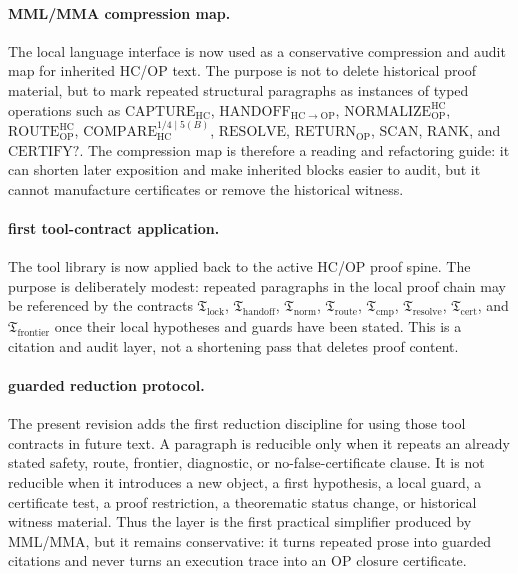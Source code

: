 \paragraph{MML/MMA compression map.}
The local language interface is now used as a conservative compression and audit map for inherited HC/OP text. The purpose is not to delete historical proof material, but to mark repeated structural paragraphs as instances of typed operations such as \(\mathrm{CAPTURE}_{\mathrm{HC}}\), \(\mathrm{HANDOFF}_{\mathrm{HC}\to\mathrm{OP}}\), \(\mathrm{NORMALIZE}_{\mathrm{OP}}^{\mathrm{HC}}\), \(\mathrm{ROUTE}_{\mathrm{OP}}^{\mathrm{HC}}\), \(\mathrm{COMPARE}_{\mathrm{HC}}^{1/4\mid 5(B)}\), \(\mathrm{RESOLVE}\), \(\mathrm{RETURN}_{\mathrm{OP}}\), \(\mathrm{SCAN}\), \(\mathrm{RANK}\), and \(\mathrm{CERTIFY?}\). The compression map is therefore a reading and refactoring guide: it can shorten later exposition and make inherited blocks easier to audit, but it cannot manufacture certificates or remove the historical witness.

\paragraph{first tool-contract application.}
The tool library is now applied back to the active HC/OP proof spine. The purpose is deliberately modest: repeated paragraphs in the local proof chain may be referenced by the contracts \(\mathfrak T_{\mathrm{lock}}\), \(\mathfrak T_{\mathrm{handoff}}\), \(\mathfrak T_{\mathrm{norm}}\), \(\mathfrak T_{\mathrm{route}}\), \(\mathfrak T_{\mathrm{cmp}}\), \(\mathfrak T_{\mathrm{resolve}}\), \(\mathfrak T_{\mathrm{cert}}\), and \(\mathfrak T_{\mathrm{frontier}}\) once their local hypotheses and guards have been stated. This is a citation and audit layer, not a shortening pass that deletes proof content.


\paragraph{guarded reduction protocol.}
The present revision adds the first reduction discipline for using those tool contracts in future text. A paragraph is reducible only when it repeats an already stated safety, route, frontier, diagnostic, or no-false-certificate clause. It is not reducible when it introduces a new object, a first hypothesis, a local guard, a certificate test, a proof restriction, a theorematic status change, or historical witness material. Thus the layer is the first practical simplifier produced by MML/MMA, but it remains conservative: it turns repeated prose into guarded citations and never turns an execution trace into an OP closure certificate.


